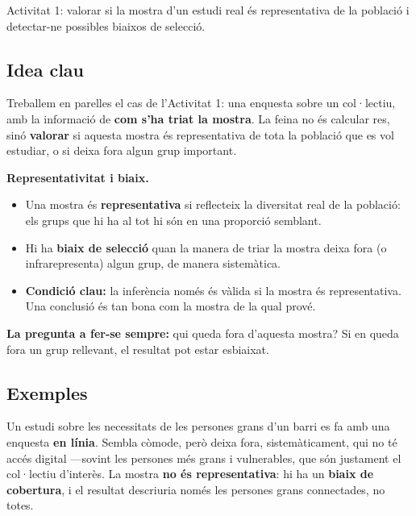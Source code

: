 %
{Activitat 1: valorar si la mostra d'un estudi real és representativa de la població i detectar-ne possibles biaixos de selecció.}

\subsection{Idea clau}

Treballem en parelles el cas de l'Activitat 1: una enquesta sobre un col·lectiu, amb la
informació de \textbf{com s'ha triat la mostra}. La feina no és calcular res, sinó
\textbf{valorar} si aquesta mostra és representativa de tota la població que es vol
estudiar, o si deixa fora algun grup important.

\begin{idea}
\textbf{Representativitat i biaix.}
\begin{itemize}[leftmargin=1.4em, itemsep=2pt]
  \item Una mostra és \textbf{representativa} si reflecteix la diversitat real de la
        població: els grups que hi ha al tot hi són en una proporció semblant.
  \item Hi ha \textbf{biaix de selecció} quan la manera de triar la mostra deixa fora (o
        infrarepresenta) algun grup, de manera sistemàtica.
  \item \textbf{Condició clau:} la inferència només és vàlida si la mostra és
        representativa. Una conclusió és tan bona com la mostra de la qual prové.
\end{itemize}
\textbf{La pregunta a fer-se sempre:} qui queda fora d'aquesta mostra? Si en queda fora un
grup rellevant, el resultat pot estar esbiaixat.
\end{idea}

\subsection{Exemples}

\begin{exemple}
Un estudi sobre les necessitats de les persones grans d'un barri es fa amb una enquesta
\textbf{en línia}. Sembla còmode, però deixa fora, sistemàticament, qui no té accés digital
—sovint les persones més grans i vulnerables, que són justament el col·lectiu d'interès.
La mostra \textbf{no és representativa}: hi ha un \textbf{biaix de cobertura}, i el resultat
descriuria només les persones grans connectades, no totes.
\end{exemple}

